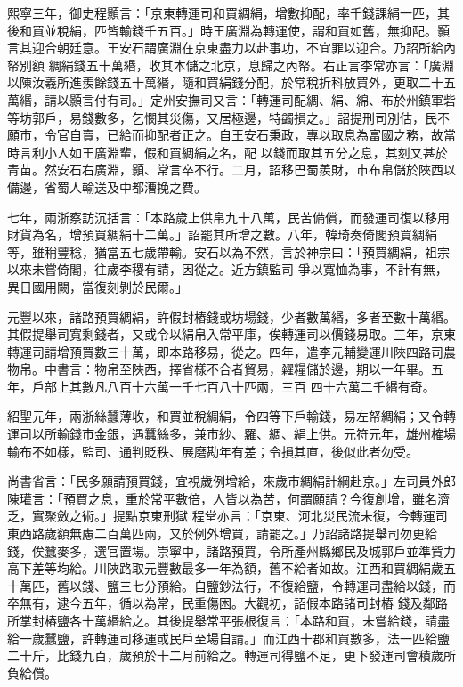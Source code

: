 \begin{pinyinscope}
 熙寧三年，御史程顥言：「京東轉運司和買綢絹，增數抑配，率千錢課絹一匹，其後和買並稅絹，匹皆輸錢千五百。」時王廣淵為轉運使，謂和買如舊，無抑配。顥言其迎合朝廷意。王安石謂廣淵在京東盡力以赴事功，不宜罪以迎合。乃詔所給內帑別額
 綢絹錢五十萬緡，收其本儲之北京，息歸之內帑。右正言李常亦言：「廣淵以陳汝羲所進羨餘錢五十萬緡，隨和買絹錢分配，於常稅折科放買外，更取二十五萬緡，請以顥言付有司。」定州安撫司又言：「轉運司配綢、絹、綿、布於州鎮軍砦等坊郭戶，易錢數多，乞憫其災傷，又居極邊，特蠲損之。」詔提刑司別估，民不願市，令官自賣，已給而抑配者正之。自王安石秉政，專以取息為富國之務，故當時言利小人如王廣淵輩，假和買綢絹之名，配
 以錢而取其五分之息，其刻又甚於青苗。然安石右廣淵，顥、常言卒不行。二月，詔移巴蜀羨財，市布帛儲於陜西以備邊，省蜀人輸送及中都漕挽之費。



 七年，兩浙察訪沉括言：「本路歲上供帛九十八萬，民苦備償，而發運司復以移用財貨為名，增預買綢絹十二萬。」詔罷其所增之數。八年，韓琦奏倚閣預買綢絹等，雖稍豐稔，猶當五七歲帶輸。安石以為不然，言於神宗曰：「預買綢絹，祖宗以來未嘗倚閣，往歲李稷有請，因從之。近方鎮監司
 爭以寬恤為事，不計有無，異日國用闕，當復刻剝於民爾。」



 元豐以來，諸路預買綢絹，許假封樁錢或坊場錢，少者數萬緡，多者至數十萬緡。其假提舉司寬剩錢者，又或令以絹帛入常平庫，俟轉運司以價錢易取。三年，京東轉運司請增預買數三十萬，即本路移易，從之。四年，遣李元輔變運川陜四路司農物帛。中書言：物帛至陜西，擇省樣不合者貿易，糴糧儲於邊，期以一年畢。五年，戶部上其數凡八百十六萬一千七百八十匹兩，三百
 四十六萬二千緡有奇。



 紹聖元年，兩浙絲蠶薄收，和買並稅綢絹，令四等下戶輸錢，易左帑綢絹；又令轉運司以所輸錢市金銀，遇蠶絲多，兼市紗、羅、綢、絹上供。元符元年，雄州榷場輸布不如樣，監司、通判貶秩、展磨勘年有差；令損其直，後似此者勿受。



 尚書省言：「民多願請預買錢，宜視歲例增給，來歲市綢絹計綱赴京。」左司員外郎陳瓘言：「預買之息，重於常平數倍，人皆以為苦，何謂願請？今復創增，雖名濟乏，實聚斂之術。」提點京東刑獄
 程堂亦言：「京東、河北災民流未復，今轉運司東西路歲額無慮二百萬匹兩，又於例外增買，請罷之。」乃詔諸路提舉司勿更給錢，俟蠶麥多，選官置場。崇寧中，諸路預買，令所產州縣鄉民及城郭戶並準貲力高下差等均給。川陜路取元豐數最多一年為額，舊不給者如故。江西和買綢絹歲五十萬匹，舊以錢、鹽三七分預給。自鹽鈔法行，不復給鹽，令轉運司盡給以錢，而卒無有，逮今五年，循以為常，民重傷困。大觀初，詔假本路諸司封樁
 錢及鄰路所掌封樁鹽各十萬緡給之。其後提舉常平張根復言：「本路和買，未嘗給錢，請盡給一歲蠶鹽，許轉運司移運或民戶至場自請。」而江西十郡和買數多，法一匹給鹽二十斤，比錢九百，歲預於十二月前給之。轉運司得鹽不足，更下發運司會積歲所負給償。




\end{pinyinscope}
